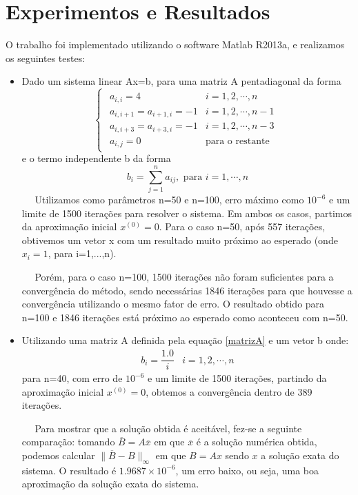 \documentclass[10pt,a4paper]{article}
\begin{document}
\section*{Experimentos e Resultados}
    O trabalho foi implementado utilizando o software Matlab R2013a, e realizamos os seguintes testes:
\begin{itemize}
\item Dado um sistema linear Ax=b, para uma matriz A pentadiagonal da forma
\begin{equation}
\tag{1}
\begin{cases}
    \begin{array}{ll}
        a_{i,i}=4 & i=1,2,\cdots, n \\
        a_{i,i+1}=a_{i+1,i}=-1 & i=1,2,\cdots,n-1 \\
        a_{i,i+3}=a_{i+3,i}=-1 & i=1,2,\cdots,n-3 \\
        a_{i,j}=0& \mbox{para o restante}
    \end{array}
\end{cases}
\label{matrizA}
\end{equation}
e o termo independente b da forma
\begin{equation}
\nonumber
b_i=\underset{j=1}{\overset{n}\sum}a_{ij}, \mbox{ para }i=1,\cdots,n
\end{equation}
$\quad$ Utilizamos como parâmetros n=50 e n=100, erro máximo como $10^{-6}$ e um limite de 1500 iterações para resolver o sistema. Em ambos os casos, partimos da aproximação inicial $x^{(0)}=0$. Para o caso n=50, após 557 iterações, obtivemos um vetor x com um resultado muito próximo ao esperado (onde $x_i =1$, para i=1,...,n).

$\quad$ Porém, para o caso n=100, 1500 iterações não foram suficientes para a convergência do método, sendo necessárias 1846 iterações para que houvesse a convergência utilizando o mesmo fator de erro. O resultado obtido para n=100 e 1846 iterações está próximo ao esperado como aconteceu com n=50.

\item     Utilizando uma matriz A definida pela equação \eqref{matrizA} e um vetor b onde:
\begin{equation}
\nonumber
\begin{array}{ll}
b_i=\dfrac{1.0}{i} & i=1,2,\cdots,n
\end{array}
\end{equation}
para n=40, com erro de $10^{-6}$ e um limite de 1500 iterações, partindo da aproximação inicial $x^{(0)}=0$, obtemos a convergência dentro de 389 iterações.

$\quad$ Para mostrar que a solução obtida é aceitável, fez-se a seguinte comparação: tomando $\overline{B}=A\overline{x}$ em que $\overline{x}$ é a solução numérica obtida, podemos calcular $\| \overline{B} - B\|_{\infty}$ em que $B = Ax$ sendo $x$ a solução exata do sistema. O resultado é $1.9687\times 10^{-6}$, um erro baixo, ou seja, uma boa aproximação da solução exata do sistema.
\end{itemize}
\end{document}
